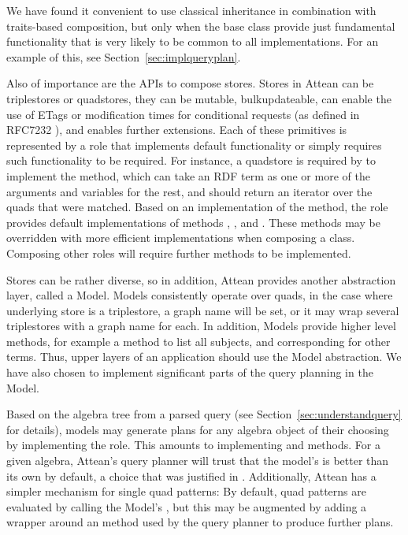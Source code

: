 We have found it convenient to use classical inheritance in
combination with traits-based composition, but only when the base
class provide just fundamental functionality that is very likely to be
common to all implementations. For an example of this, see
Section~\ref{sec:implqueryplan}.

Also of importance are the APIs to compose stores. Stores in Attean
can be triplestores or quadstores, they can be mutable,
bulkupdateable, can enable the use of ETags or modification times for
conditional requests (as defined in RFC7232 \cite{rfc7234}), and
enables further extensions. Each of these primitives is represented
by a role that implements default functionality or simply requires
such functionality to be required. For instance, a quadstore is
required by  to implement the
 method, which can take an RDF term as one or more
of the arguments and variables for the rest, and should return an
iterator over the quads that were matched. Based on an implementation
of the  method, the 
role provides default implementations of methods ,
,  and
. These methods may be overridden with more efficient
implementations when composing a class. Composing other roles will
require further methods to be implemented.

Stores can be rather diverse, so in addition, Attean provides another
abstraction layer, called a Model. Models consistently operate over
quads, in the case where underlying store is a triplestore, a graph
name will be set, or it may wrap several triplestores with a graph
name for each. In addition, Models provide higher level methods,
for example a  method to list all subjects, and
corresponding for other terms. Thus, upper layers of an application
should use the Model abstraction. We have also chosen to implement significant
parts of the query planning in the Model.

Based on the algebra tree from a parsed query (see
Section~\ref{sec:understandquery} for details), models may generate
plans for any algebra object of
their choosing by implementing the 
role. This amounts to implementing  and
 methods. For a given algebra, Attean's query
planner will trust that the model's  is
better than its own by default, a choice that was justified in
\cite{williamspushing}. Additionally, Attean has a simpler mechanism
for single quad patterns: By default, quad patterns are evaluated by
calling the Model's , but this may be augmented by
adding a wrapper around an  method used by the
query planner to produce further plans.

